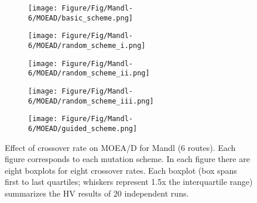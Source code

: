 \begin{figure}[!htbp]
	\centering
	\begin{subfigure}[b]{0.52\textwidth}
		\texttt{[image: Figure/Fig/Mandl-6/MOEAD/basic\_scheme.png]}
	\end{subfigure}%
	\begin{subfigure}[b]{0.52\textwidth}
		\texttt{[image: Figure/Fig/Mandl-6/MOEAD/random\_scheme\_i.png]}
	\end{subfigure}%
	\newline
	\begin{subfigure}[b]{0.52\textwidth}
		\texttt{[image: Figure/Fig/Mandl-6/MOEAD/random\_scheme\_ii.png]}
	\end{subfigure}%
	\begin{subfigure}[b]{0.52\textwidth}
		\texttt{[image: Figure/Fig/Mandl-6/MOEAD/random\_scheme\_iii.png]}
	\end{subfigure}%
	\newline
	\begin{subfigure}[b]{0.52\textwidth}
		\texttt{[image: Figure/Fig/Mandl-6/MOEAD/guided\_scheme.png]}
	\end{subfigure}%
	\caption{Effect of crossover rate on MOEA/D for Mandl (6 routes). Each figure corresponds to each mutation scheme. In each figure there are eight boxplots for eight crossover rates.  Each boxplot (box spans first to last quartiles; whiskers represent 1.5x the interquartile range) summarizes the HV results of 20 independent runs.}
	\label{fig:cr_mandl6_moead}
\end{figure}
